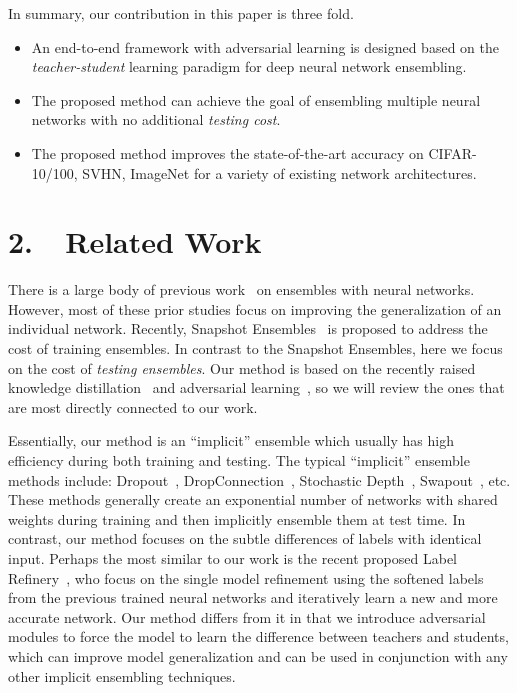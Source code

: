 \documentclass[letterpaper]{article} %
\begin{document}
In summary, our contribution in this paper is three fold.

\begin{itemize}
	\addtolength{\itemsep}{-0.05in}
	\item  An end-to-end framework with adversarial learning is designed based on the {\em {teacher-student}} learning paradigm for deep neural network ensembling.
	\item The proposed method can achieve the goal of ensembling multiple neural networks with no additional {\em {testing cost}}.
	\item The proposed method improves the state-of-the-art accuracy on CIFAR-10/100, SVHN, ImageNet for a variety of existing network architectures.
\end{itemize}


\section{2.~~Related Work}

There is a large body of previous work~\cite{hansen1990neural,perrone1995networks,krogh1995neural,dietterich2000ensemble,huang2017snapshot,lakshminarayanan2017simple} on ensembles with neural networks. However, most of these prior studies focus on improving the generalization of an individual network. Recently, Snapshot Ensembles~\cite{huang2017snapshot} is proposed to address the cost of training ensembles. In contrast to the Snapshot Ensembles, here we focus on the cost of {\em {testing ensembles}}. Our method is based on the recently raised knowledge distillation~\cite{hinton2015distilling,papernot2016semi,li2017learning,yim2017gift} and adversarial learning~\cite{goodfellow2014generative}, so we will review the ones that are most directly connected to our work.

Essentially, our method is an ``implicit'' ensemble which usually has high efficiency during both training and testing. The typical ``implicit'' ensemble methods include: Dropout~\cite{srivastava2014dropout}, DropConnection~\cite{wan2013regularization}, Stochastic Depth~\cite{huang2016deep}, Swapout~\cite{singh2016swapout}, etc. These methods generally create an exponential number of networks with shared weights during training and then implicitly ensemble them at test time. In contrast, our method focuses on the  subtle differences of labels with identical input. Perhaps the most similar to our work is the recent proposed Label Refinery~\cite{bagherinezhad2018label}, who focus on the single model refinement using the softened labels from the previous trained neural networks and iteratively learn a new and more accurate network. Our method differs from it in that we introduce adversarial modules to force the model to learn the difference between teachers and students, which can improve model generalization and can be used in conjunction with any other implicit ensembling techniques. %
\end{document}
